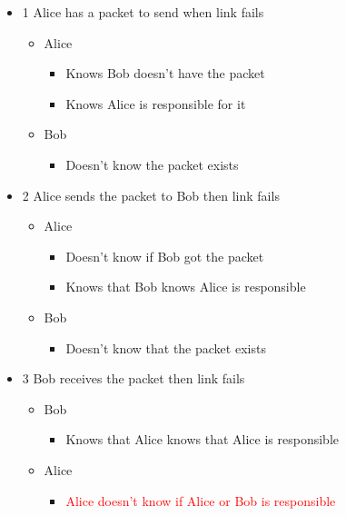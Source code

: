 \documentclass[../HFT-main.tex]{subfiles}
\begin{document}
\begin{itemize}
    \item 1  Alice has a packet to send when link fails
    \begin{itemize}
        \item Alice
        \begin{itemize}
            \item Knows Bob doesn’t have the packet
            \item Knows Alice is responsible for it
        \end{itemize}
        \item Bob
        \begin{itemize}
            \item Doesn’t know the packet exists
        \end{itemize}
    \end{itemize}
    
    \item 2 Alice sends the packet to Bob then link fails
    \begin{itemize}
        \item Alice
        \begin{itemize}
            \item Doesn’t know if Bob got the packet
            \item Knows that Bob knows Alice is responsible
        \end{itemize}
        \item Bob
        \begin{itemize}
            \item Doesn’t know that the packet exists
        \end{itemize}
    \end{itemize}

    \item  3 Bob receives the packet then link fails
    \begin{itemize}
        \item Bob
        \begin{itemize}
            \item Knows that Alice knows that Alice is responsible
        \end{itemize}
        \item Alice
        \begin{itemize}
            \item \textcolor{red}{Alice doesn’t know if Alice or Bob is responsible}
        \end{itemize}
    \end{itemize}


\end{itemize}
\end{document}

